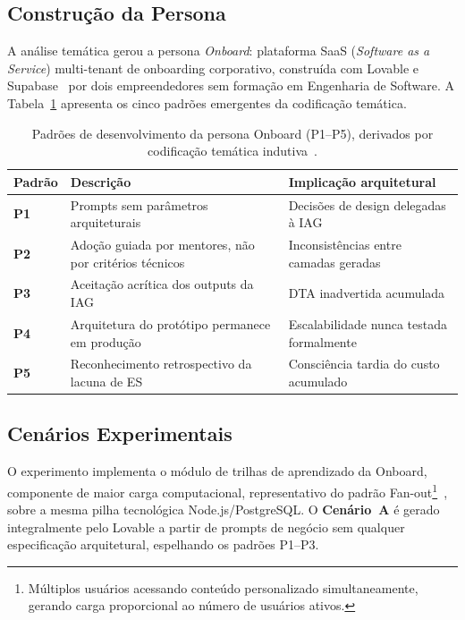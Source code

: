 \documentclass[sigconf]{acmart}
\begin{document}
\subsection{Construção da Persona}

A análise temática gerou a persona \textit{Onboard}: plataforma SaaS
(\textit{Software as a Service}) multi-tenant de onboarding corporativo, construída
com Lovable e Supabase~\cite{Supabase2024} por dois empreendedores sem formação em
Engenharia de Software. A Tabela~\ref{tab:padroes} apresenta os cinco padrões
emergentes da codificação temática.

\begin{table}[t]
  \caption{Padrões de desenvolvimento da persona Onboard (P1--P5), derivados por
           codificação temática indutiva~\cite{Braun2006}.}
  \label{tab:padroes}
  \small
  \begin{tabular}{p{0.9cm}p{2.3cm}p{2.4cm}}
    \toprule
    \textbf{Padrão} & \textbf{Descrição} & \textbf{Implicação arquitetural} \\
    \midrule
    \textbf{P1} & Prompts sem parâmetros arquiteturais & Decisões de design delegadas à IAG \\
    \textbf{P2} & Adoção guiada por mentores, não por critérios técnicos & Inconsistências entre camadas geradas \\
    \textbf{P3} & Aceitação acrítica dos outputs da IAG & DTA inadvertida acumulada \\
    \textbf{P4} & Arquitetura do protótipo permanece em produção & Escalabilidade nunca testada formalmente \\
    \textbf{P5} & Reconhecimento retrospectivo da lacuna de ES & Consciência tardia do custo acumulado \\
    \bottomrule
  \end{tabular}
\end{table}

\subsection{Cenários Experimentais}

O experimento implementa o módulo de trilhas de aprendizado da Onboard, componente
de maior carga computacional, representativo do padrão Fan-out\footnote{Múltiplos usuários acessando conteúdo personalizado simultaneamente, gerando carga proporcional ao número de usuários ativos.}~\cite{Kleppmann2017},
sobre a mesma pilha tecnológica Node.js/PostgreSQL. O \textbf{Cenário~A} é gerado integralmente
pelo Lovable a partir de prompts de negócio sem qualquer especificação arquitetural,
espelhando os padrões P1--P3.
\end{document}
